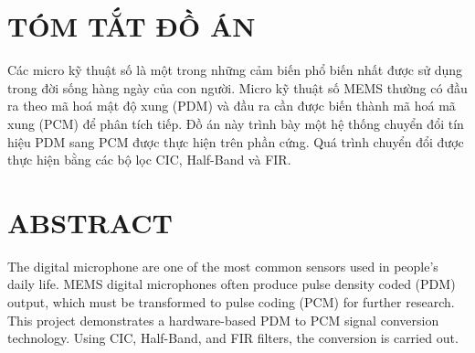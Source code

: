 \section*{TÓM TẮT ĐỒ ÁN}
Các micro kỹ thuật số là một trong những cảm biến phổ biến nhất được sử dụng trong đời sống hàng ngày của con người. Micro kỹ thuật số MEMS thường có đầu ra theo mã hoá mật độ xung (PDM) và đầu ra cần được biến thành mã hoá mã xung (PCM) để phân tích tiếp. Đồ án này trình bày một hệ thống chuyển đổi tín hiệu PDM sang PCM được thực hiện trên phần cứng. Quá trình chuyển đổi được thực hiện bằng các bộ lọc CIC, Half-Band và FIR.
\newpage

\section*{ABSTRACT}
The digital microphone are one of the most common sensors used in people's daily life. MEMS digital microphones often produce pulse density coded (PDM) output, which must be transformed to pulse coding (PCM) for further research. This project demonstrates a hardware-based PDM to PCM signal conversion technology. Using CIC, Half-Band, and FIR filters, the conversion is carried out.
\newpage